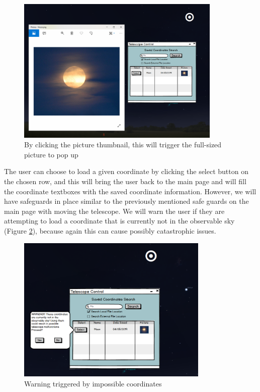 \documentclass[12pt]{article}
\begin{document}
\newpage

\begin{figure}[h]
	\centering
	\includegraphics[width=0.65\linewidth, height=7.0cm]{SearchClickedPicture}
	\caption{By clicking the picture thumbnail, this will trigger the full-sized picture to pop up}
	\label{fig:SearchClickedPicture}
\end{figure}

The user can choose to load a given coordinate by clicking the select button on the chosen row, and this will bring the user back to the main page and will fill the coordinate textboxes with the saved coordinate information. However, we will have safeguards in place similar to the previously mentioned safe guards on the main page with moving the telescope. We will warn the user if they are attempting to load a coordinate that is currently not in the observable sky (Figure \ref{fig:SearchwithWarning}), because again this can cause possibly catastrophic issues.

\begin{figure}[h]
	\centering
	\includegraphics[width=0.65\linewidth, height=7.0cm]{SearchwithWarning}
	\caption{Warning triggered by impossible coordinates}
	\label{fig:SearchwithWarning}
\end{figure}
\end{document}

